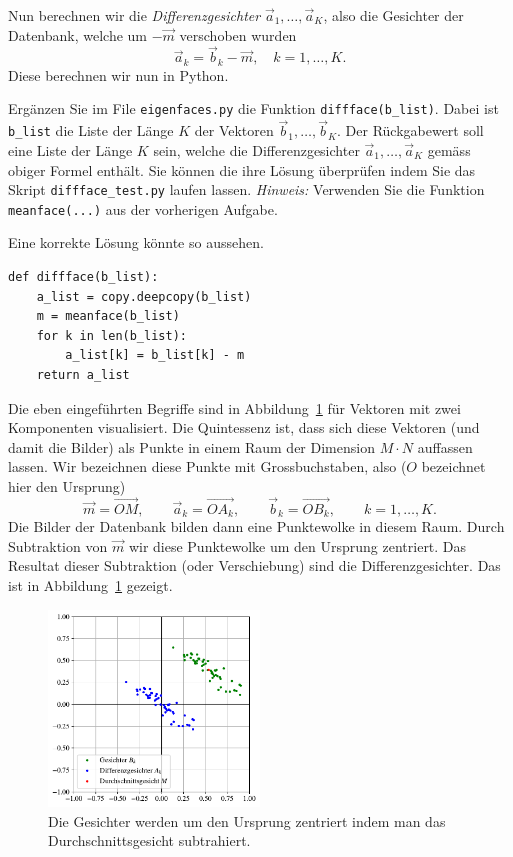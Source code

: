 Nun berechnen wir die \textit{Differenzgesichter} $\vec a_1,\ldots,\vec a_K$, also die Gesichter der Datenbank, welche um $-\vec{m}$ verschoben wurden
\begin{equation*}
	\vec a_k=\vec b_k-\vec m,\quad k=1,\ldots,K.
\end{equation*}
Diese berechnen wir nun in Python.
\begin{aufgabe} \label{aufg:diffface}
	Ergänzen Sie im File \texttt{eigenfaces.py} die Funktion \texttt{diffface(b\_list)}.
	Dabei ist \texttt{b\_list} die Liste der Länge $K$ der Vektoren $\vec b_1,\ldots,\vec b_K$.
	Der Rückgabewert soll eine Liste der Länge $K$ sein, welche die Differenzgesichter $\vec a_1,\ldots,\vec a_K$ gemäss obiger Formel enthält.
	Sie können die ihre Lösung überprüfen indem Sie das Skript \texttt{diffface\_test.py} laufen lassen.
	\textit{Hinweis:} Verwenden Sie die Funktion \texttt{meanface(...)} aus der vorherigen Aufgabe.
\end{aufgabe}
\begin{losung}
	Eine korrekte Lösung könnte so aussehen.
\begin{lstlisting}[style=python]
def diffface(b_list):
	a_list = copy.deepcopy(b_list)
	m = meanface(b_list)
	for k in len(b_list):
		a_list[k] = b_list[k] - m
	return a_list
\end{lstlisting}
\end{losung}
Die eben eingeführten Begriffe sind in Abbildung~\ref{fig:meandiff} für Vektoren mit zwei Komponenten visualisiert.
Die Quintessenz ist, dass sich diese Vektoren (und damit die Bilder) als Punkte in einem Raum der Dimension $M\cdot N$ auffassen lassen.
Wir bezeichnen diese Punkte mit Grossbuchstaben, also ($O$ bezeichnet hier den Ursprung)
\begin{equation*}
	\vec{m}=\overrightarrow{OM},\qquad
	\vec{a}_k=\overrightarrow{OA_k},\qquad
	\vec{b}_k=\overrightarrow{OB_k},\qquad
	k=1,\ldots,K.
\end{equation*}
Die Bilder der Datenbank bilden dann eine \glqq{}Punktewolke\grqq{} in diesem Raum.
Durch Subtraktion von $\vec m$ wir diese Punktewolke um den Ursprung zentriert.
Das Resultat dieser Subtraktion (oder Verschiebung) sind die Differenzgesichter.
Das ist in Abbildung~\ref{fig:meandiff} gezeigt.
\begin{figure}[ht]
	\centering
	\includegraphics[width=0.5\textwidth]{images/facespace/meandiff}
	\caption{Die Gesichter werden um den Ursprung zentriert indem man das Durchschnittsgesicht subtrahiert.}
	\label{fig:meandiff}
\end{figure}
